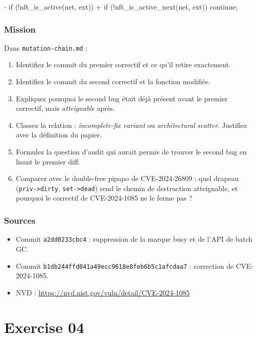 \documentclass{training}
\begin{document}
\begin{console}
- if (!nft_is_active(net, ext))
+ if (!nft_is_active_next(net, ext))
      continue;
\end{console}

\subsection*{Mission}

Dans \texttt{mutation-chain.md} :

\begin{enumerate}
  \item Identifiez le commit du premier correctif et ce qu'il retire
        exactement.
  \item Identifiez le commit du second correctif et la fonction modifiée.
  \item Expliquez pourquoi le second bug était déjà présent avant le
        premier correctif, mais \emph{atteignable} après.
  \item Classez la relation : \emph{incomplete-fix variant} ou
        \emph{architectural scatter}. Justifiez avec la définition du
        papier.
  \item Formulez la question d'audit qui aurait permis de trouver le second
        bug en lisant le premier diff.
  \item Comparez avec le double-free pipapo de CVE-2024-26809 : quel
        drapeau (\texttt{priv->dirty}, \texttt{set->dead}) rend le chemin
        de destruction atteignable, et pourquoi le correctif de
        CVE-2024-1085 ne le ferme pas ?
\end{enumerate}

\subsection*{Sources}
\begin{itemize}
  \item Commit \texttt{a2dd0233cbc4} : suppression de la marque busy et de
        l'API de batch GC.
  \item Commit \texttt{b1db244ffd041a49ecc9618e8feb6b5c1afcdaa7} :
        correction de CVE-2024-1085.
  \item NVD : \url{https://nvd.nist.gov/vuln/detail/CVE-2024-1085}
\end{itemize}

\chapter{Exercise 04}
\makeheaderfiles
\end{document}
